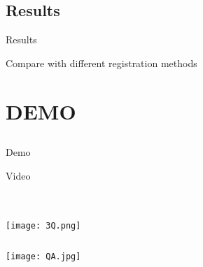 \documentclass[xcolor=table,compress,blue]{beamer}
\begin{document}
\subsection{Results}
\begin{frame}{Results}
	\begin{exampleblock}{Compare with different registration methods}
	\end{exampleblock}
\end{frame}



\section{DEMO}
\subsection{}
\begin{frame}{Demo}
	\begin{exampleblock}{Video}
	\end{exampleblock}
\end{frame}



\section{}
\begin{frame}[plain]
	\thispagestyle{empty}
	\begin{columns}
		\begin{column}{\paperwidth}
			\texttt{[image: 3Q.png]}
		\end{column}
	\end{columns}
\end{frame}

\begin{frame}[plain]
	\thispagestyle{empty}
	\begin{columns}
		\begin{column}{\paperwidth}
			\texttt{[image: QA.jpg]}
		\end{column}
	\end{columns}
\end{frame}
\end{document}
